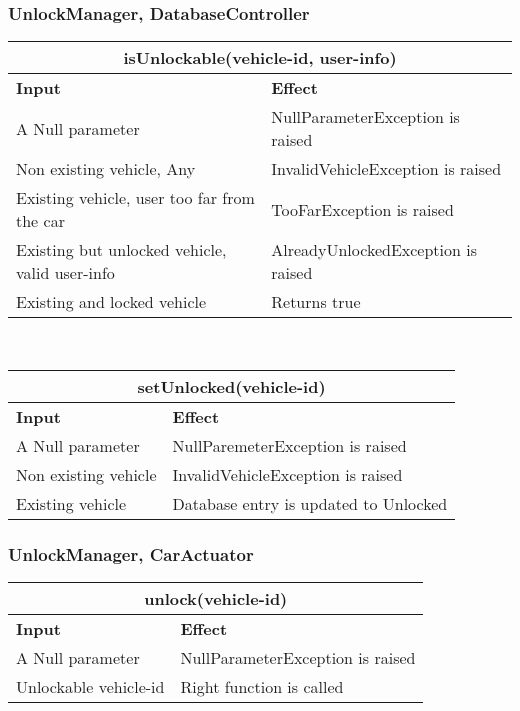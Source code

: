 \subsubsection{UnlockManager, DatabaseController} 
\begin{tabular}{|p{5cm}|p{7cm}|}
\hline
\multicolumn{2}{|c|}{isUnlockable(vehicle-id, user-info)}\\
\hline
\textbf{Input} & \textbf{Effect}\\

\hline
A Null parameter & NullParameterException is raised \\

\hline
Non existing vehicle, Any & InvalidVehicleException is raised\\

\hline
Existing vehicle, user too far from the car & TooFarException is raised\\

\hline
Existing but unlocked vehicle, valid user-info & AlreadyUnlockedException is raised\\

\hline
Existing and locked vehicle & Returns true\\
\hline
\end{tabular}
\\
\begin{tabular}{|p{5cm}|p{7cm}|}
\hline
\multicolumn{2}{|c|}{setUnlocked(vehicle-id)}\\
\hline
\textbf{Input} & \textbf{Effect}\\

\hline
A Null parameter & NullParemeterException is raised \\

\hline
Non existing vehicle & InvalidVehicleException is raised\\

\hline
Existing vehicle & Database entry is updated to Unlocked \\
\hline
\end{tabular}

\subsubsection{UnlockManager, CarActuator} 
\begin{tabular}{|p{5cm}|p{7cm}|}
\hline
\multicolumn{2}{|c|}{unlock(vehicle-id)}\\
\hline
\textbf{Input} & \textbf{Effect}\\

\hline
A Null parameter & NullParameterException is raised \\

\hline
Unlockable vehicle-id & Right function is called\\
\hline
\end{tabular}


